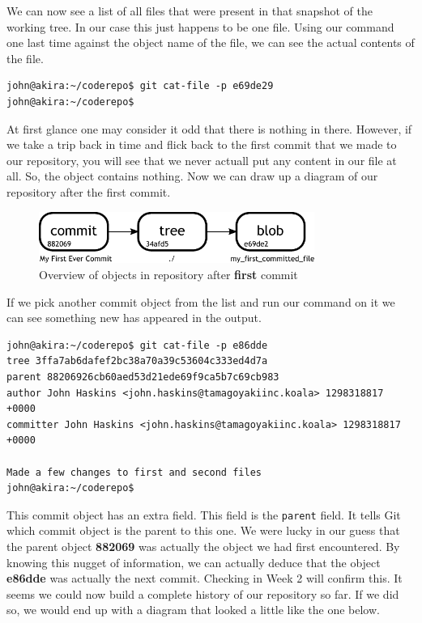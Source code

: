 We can now see a list of all files that were present in that snapshot of the working tree.  In our case this just happens to be one file.  Using our command one last time against the object name of the file, we can see the actual contents of the file.

\begin{Verbatim}[frame=leftline,framerule=1mm,fontsize=\relsize{-3}]
john@akira:~/coderepo$ git cat-file -p e69de29
john@akira:~/coderepo$
\end{Verbatim}

At first glance one may consider it odd that there is nothing in there.  However, if we take a trip back in time and flick back to the first commit that we made to our repository, you will see that we never actuall put any content in our file at all.  So, the object contains nothing.  Now we can draw up a diagram of our repository after the first commit.

\begin{figure}[hbt]
\centering
\includegraphics[width=9cm]{images/f-af2-d2.pdf}
\caption{Overview of objects in repository after \textbf{first} commit}
\end{figure}

If we pick another commit object from the list and run our command on it we can see something new has appeared in the output.

\begin{Verbatim}[frame=leftline,framerule=1mm,fontsize=\relsize{-3}]
john@akira:~/coderepo$ git cat-file -p e86dde
tree 3ffa7ab6dafef2bc38a70a39c53604c333ed4d7a
parent 88206926cb60aed53d21ede69f9ca5b7c69cb983
author John Haskins <john.haskins@tamagoyakiinc.koala> 1298318817 +0000
committer John Haskins <john.haskins@tamagoyakiinc.koala> 1298318817 +0000

Made a few changes to first and second files
john@akira:~/coderepo$ 
\end{Verbatim}

This commit object has an extra field.  This field is the \texttt{parent} field.  It tells Git which commit object is the parent to this one.  We were lucky in our guess that the parent object \textbf{882069} was actually the object we had first encountered.  By knowing this nugget of information, we can actually deduce that the object \textbf{e86dde} was actually the next commit.  Checking in Week 2 will confirm this.  It seems we could now build a complete history of our repository so far.  If we did so, we would end up with a diagram that looked a little like the one below.

